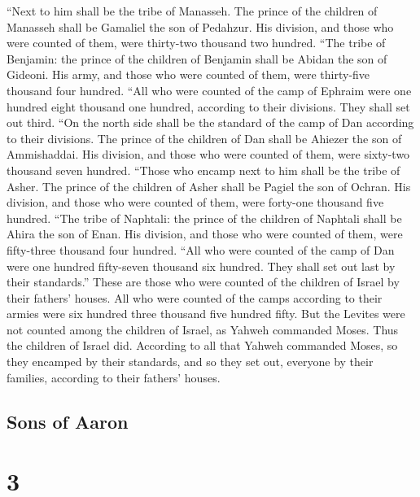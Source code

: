  ``Next to him shall be the tribe of Manasseh. The prince
of the children of Manasseh shall be Gamaliel the son of Pedahzur.
 His division, and those who were counted of them, were
thirty-two thousand two hundred.  ``The tribe of
Benjamin: the prince of the children of Benjamin shall be Abidan the son
of Gideoni.  His army, and those who were counted of
them, were thirty-five thousand four hundred.  ``All who
were counted of the camp of Ephraim were one hundred eight thousand one
hundred, according to their divisions. They shall set out third.
 ``On the north side shall be the standard of the camp of
Dan according to their divisions. The prince of the children of Dan
shall be Ahiezer the son of Ammishaddai.  His division,
and those who were counted of them, were sixty-two thousand seven
hundred.  ``Those who encamp next to him shall be the
tribe of Asher. The prince of the children of Asher shall be Pagiel the
son of Ochran.  His division, and those who were counted
of them, were forty-one thousand five hundred.  ``The
tribe of Naphtali: the prince of the children of Naphtali shall be Ahira
the son of Enan.  His division, and those who were
counted of them, were fifty-three thousand four hundred. 
``All who were counted of the camp of Dan were one hundred fifty-seven
thousand six hundred. They shall set out last by their standards.''
 These are those who were counted of the children of
Israel by their fathers' houses. All who were counted of the camps
according to their armies were six hundred three thousand five hundred
fifty.  But the Levites were not counted among the
children of Israel, as Yahweh commanded Moses.  Thus the
children of Israel did. According to all that Yahweh commanded Moses, so
they encamped by their standards, and so they set out, everyone by their
families, according to their fathers' houses.

\hypertarget{sons-of-aaron}{%
\subsection{Sons of Aaron}\label{sons-of-aaron}}

\hypertarget{section-2}{%
\section{3}\label{section-2}}

